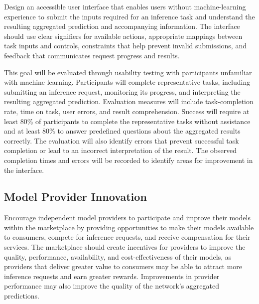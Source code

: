 \documentclass{article}
\begin{document}
Design an accessible user interface that enables users without
machine-learning experience to submit the inputs required for an
inference task and understand the resulting aggregated prediction
and accompanying information. The interface should use clear
signifiers for available actions, appropriate mappings between task
inputs and controls, constraints that help prevent invalid
submissions, and feedback that communicates request progress and
results.

This goal will be evaluated through usability testing with
participants unfamiliar with machine learning. Participants will
complete representative tasks, including submitting an inference
request, monitoring its progress, and interpreting the resulting
aggregated prediction. Evaluation measures will include task-completion
rate, time on task, user errors, and result comprehension. Success
will require at least 80\% of participants to complete the
representative tasks without assistance and at least 80\% to answer
predefined questions about the aggregated results correctly.
The evaluation will also identify errors that prevent successful
task completion or lead to an incorrect interpretation of the
result. The observed completion times and errors will be recorded
to identify areas for improvement in the interface.

\subsection{Model Provider Innovation}

Encourage independent model providers to participate and improve
their models within the marketplace by providing opportunities to
make their models available to consumers, compete for inference
requests, and receive compensation for their services. The marketplace
should create incentives for providers to improve the quality,
performance, availability, and cost-effectiveness of their models,
as providers that deliver greater value to consumers may be able to
attract more inference requests and earn greater rewards. Improvements
in provider performance may also improve the quality of the network's
aggregated predictions.
\end{document}
